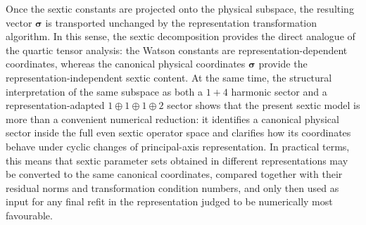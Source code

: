 Once the sextic constants are projected onto the physical subspace, the
resulting vector $\boldsymbol\sigma$ is transported unchanged by the
representation transformation algorithm.  In this sense, the sextic
decomposition provides the direct analogue of the quartic tensor analysis:
the Watson constants are representation-dependent coordinates, whereas the
canonical physical coordinates $\boldsymbol\sigma$ provide the
representation-independent sextic content.  At the same time, the structural
interpretation of the same subspace as both a $1+4$ harmonic sector and a
representation-adapted $1\oplus1\oplus1\oplus2$ sector shows that the present
sextic model is more than a convenient numerical reduction: it identifies a
canonical physical sector inside the full even sextic operator space and
clarifies how its coordinates behave under cyclic changes of principal-axis
representation.  In practical terms, this means that sextic parameter sets
obtained in different representations may be converted to the same canonical
coordinates, compared together with their residual norms and transformation
condition numbers, and only then used as input for any final refit in the
representation judged to be numerically most favourable.
